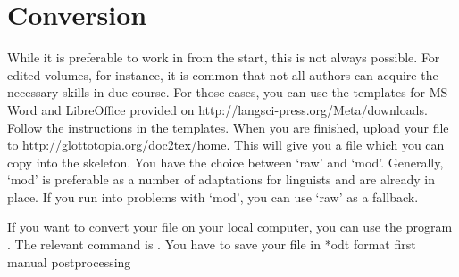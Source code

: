 \chapter{Conversion} 
While it is preferable to work in \latex from the start, this is not always possible. For edited volumes, for instance, it is common that not all authors can acquire the necessary skills in due course. For those cases, you can use the templates for MS Word and LibreOffice provided on http://langsci-press.org/Meta/downloads. Follow the instructions in the templates. When you are finished, upload your file to \url{http://glottotopia.org/doc2tex/home}. This will give you a file which you can copy into the skeleton. You have the choice between `raw' and `mod'. Generally, `mod' is preferable as a number of adaptations for linguists and \lsp are already in place. If you run into problems with `mod', you can use `raw' as a fallback.


If you want to convert your file on your local computer, you can use the program . The relevant command is . You have to save your file in *odt format first
manual postprocessing
